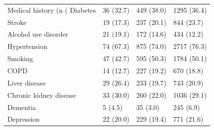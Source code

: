 \begin{table}
\begin{tabular}[t]{llll}
Medical history (n (%
\addlinespace
Diabetes & 36 (32.7) & 449 (38.0) & 1295 (36.4)\\
Stroke & 19 (17.3) & 237 (20.1) & 844 (23.7)\\
Alcohol use disorder & 21 (19.1) & 172 (14.6) & 434 (12.2)\\
Hypertension & 74 (67.3) & 875 (74.0) & 2717 (76.3)\\
Smoking & 47 (42.7) & 595 (50.3) & 1784 (50.1)\\
\addlinespace
COPD & 14 (12.7) & 227 (19.2) & 670 (18.8)\\
Liver disease & 29 (26.4) & 233 (19.7) & 743 (20.9)\\
Chronic kidney disease & 33 (30.0) & 260 (22.0) & 1036 (29.1)\\
Dementia & 5 (4.5) & 35 (3.0) & 245 (6.9)\\
Depression & 22 (20.0) & 229 (19.4) & 771 (21.6)\\
\bottomrule
\end{tabular}
\end{table}
